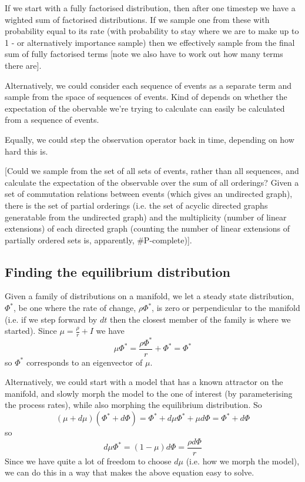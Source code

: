\documentclass[a4paper]{article}
\begin{document}
If we start with a fully factorised distribution, then after one timestep we have a wighted sum of factorised distributions. If we sample one from these with probability equal to its rate (with probability to stay where we are to make up to 1 - or alternatively importance sample) then we effectively sample from the final sum of fully factorised terms [note we also have to work out how many terms there are].

Alternatively, we could consider each sequence of events as a separate term and sample from the space of sequences of events. Kind of depends on whether the expectation of the obervable we're trying to calculate can easily be calculated from a sequence of events.

Equally, we could step the observation operator back in time, depending on how hard this is.

[Could we sample from the set of all sets of events, rather than all sequences, and calculate the expectation of the observable over the sum of all orderings? Given a set of commutation relations between events (which gives an undirected graph), there is the set of partial orderings (i.e. the set of acyclic directed graphs generatable from the undirected graph) and the multiplicity (number of linear extensions) of each directed graph (counting the number of linear extensions of partially ordered sets is, apparently, \#P-complete)].

\subsection{Finding the equilibrium distribution}

Given a family of distributions on a manifold, we let a steady state distribution, $\Phi^*$, be one where the rate of change, $\rho\Phi^*$, is zero or perpendicular to the manifold (i.e. if we step forward by $dt$ then the closest member of the family is where we started). Since $\mu = \frac{\rho}{r} + I$ we have
\[
\mu\Phi^* = \frac{\rho\Phi^*}{r} + \Phi^* = \Phi^*
\]
so $\Phi^*$ corresponds to an eigenvector of $\mu$.

Alternatively, we could start with a model that has a known attractor on the manifold, and slowly morph the model to the one of interest (by parameterising the process rates), while also morphing the equilibrium distribution. So
\[
(\mu + d\mu)(\Phi^* + d\Phi) = \Phi^* + d\mu\Phi^* + \mu d\Phi = \Phi^* + d\Phi
\]
so
\[
d\mu\Phi^*  = (1 - \mu) d\Phi = \frac{\rho d\Phi}{r}
\]
Since we have quite a lot of freedom to choose $d\mu$ (i.e. how we morph the model), we can do this in a way that makes the above equation easy to solve.
\end{document}

